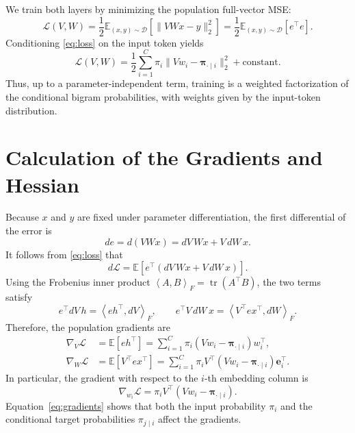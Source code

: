 \documentclass[11pt]{article}
\newcommand{\E}{\mathbb{E}}
\newcommand{\tr}{\operatorname{tr}}
\newcommand{\ip}[2]{\left\langle #1,#2\right\rangle_F}
\begin{document}
We train both layers by minimizing the population full-vector MSE:
\begin{equation}
\mathcal{L}(V,W)
=\frac12\E_{(x,y)\sim\mathcal{D}}\!\left[\|VWx-y\|_2^2\right]
=\frac12\E_{(x,y)\sim\mathcal{D}}\!\left[e^\top e\right].
\label{eq:loss}
\end{equation}
Conditioning \eqref{eq:loss} on the input token yields
\begin{equation*}
\mathcal{L}(V,W)
=\frac12\sum_{i=1}^C
\pi_i\|Vw_i-\bm{\pi}_{\cdot\mid i}\|_2^2
+\text{constant}.
\end{equation*}
Thus, up to a parameter-independent term, training is a weighted
factorization of the conditional bigram probabilities, with weights given by
the input-token distribution.

\section{Calculation of the Gradients and Hessian}

Because \(x\) and \(y\) are fixed under parameter differentiation, the first
differential of the error is
\begin{equation*}
de=d(VWx)=dV\,Wx+V\,dW\,x.
\end{equation*}
It follows from \eqref{eq:loss} that
\begin{equation*}
d\mathcal{L}
=\E\!\left[
e^\top\!\left(dV\,Wx+V\,dW\,x\right)
\right].
\end{equation*}
Using the Frobenius inner product
\(\ip{A}{B}=\tr(A^\top B)\), the two terms satisfy
\begin{equation*}
e^\top dV\,h=\ip{eh^\top}{dV},
\qquad
e^\top V\,dW\,x=\ip{V^\top e x^\top}{dW}.
\end{equation*}
Therefore, the population gradients are
\begin{equation}
\begin{aligned}
\nabla_V\mathcal{L}
&=\E[eh^\top]
=\sum_{i=1}^C
\pi_i\left(Vw_i-\bm{\pi}_{\cdot\mid i}\right)w_i^\top,\\
\nabla_W\mathcal{L}
&=\E[V^\top e x^\top]
=\sum_{i=1}^C
\pi_iV^\top\left(Vw_i-\bm{\pi}_{\cdot\mid i}\right)\bm{e}_i^\top.
\end{aligned}
\label{eq:gradients}
\end{equation}
In particular, the gradient with respect to the \(i\)-th embedding column is
\begin{equation*}
\nabla_{w_i}\mathcal{L}
=\pi_iV^\top\left(Vw_i-\bm{\pi}_{\cdot\mid i}\right).
\end{equation*}
Equation~\eqref{eq:gradients} shows that both the input probability \(\pi_i\)
and the conditional target probabilities \(\pi_{j\mid i}\) affect the
gradients.
\end{document}

